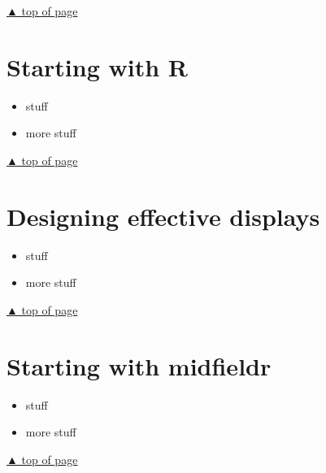 \documentclass[
]{book}
\providecommand{\tightlist}{%
  \setlength{\itemsep}{0pt}\setlength{\parskip}{0pt}}
\begin{document}
\protect\hyperlink{stories}{▲ top of page}

\hypertarget{start-with-R}{%
\chapter{Starting with R}\label{start-with-R}}

\begin{itemize}
\tightlist
\item
  stuff
\item
  more stuff
\end{itemize}

\protect\hyperlink{start-with-R}{▲ top of page}

\hypertarget{display-design}{%
\chapter{Designing effective displays}\label{display-design}}

\begin{itemize}
\tightlist
\item
  stuff
\item
  more stuff
\end{itemize}

\protect\hyperlink{display-design}{▲ top of page}

\hypertarget{start-with-midfieldr}{%
\chapter{Starting with midfieldr}\label{start-with-midfieldr}}

\begin{itemize}
\tightlist
\item
  stuff
\item
  more stuff
\end{itemize}

\protect\hyperlink{start-with-midfieldr}{▲ top of page}

  
\end{document}
